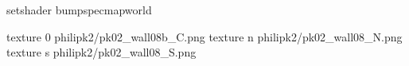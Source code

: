setshader bumpspecmapworld

texture 0 philipk2/pk02_wall08b_C.png
texture n philipk2/pk02_wall08_N.png
texture s philipk2/pk02_wall08_S.png

